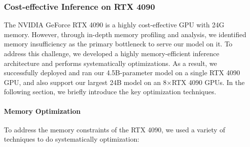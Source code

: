 \subsubsection{Cost-effective Inference on RTX 4090} 
The NVIDIA GeForce RTX 4090 is a highly cost-effective GPU with 24G memory. However, through in-depth memory profiling and analysis, we identified memory insufficiency as the primary bottleneck to serve our model on it. To address this challenge, we developed a highly memory-efficient inference architecture and performs systematically optimizations. As a result, we successfully deployed and ran our 4.5B-parameter model on a single RTX 4090 GPU, and also support our largest 24B model on an 8$\times$RTX 4090 GPUs. In the following section, we briefly introduce the key optimization techniques.

\paragraph{Memory Optimization} 
To address the memory constraints of the RTX 4090, we used a variety of techniques to do systematically optimization:
 
